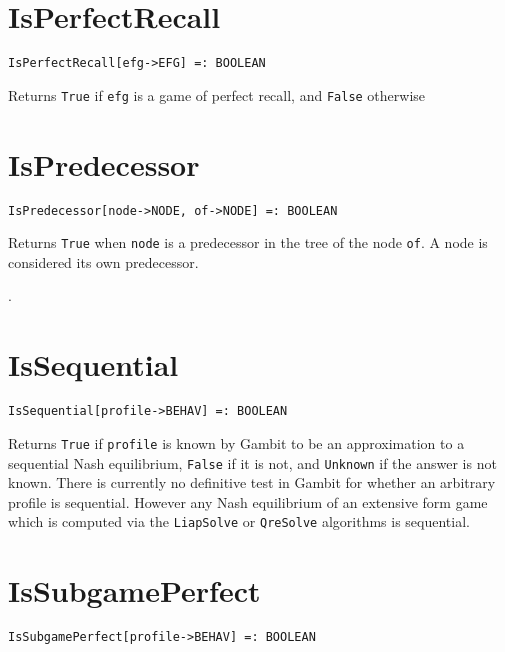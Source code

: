 
\section*{IsPerfectRecall}\label{PrimIsPerfectRecall}
\begin{verbatim}
IsPerfectRecall[efg->EFG] =: BOOLEAN 
\end{verbatim}

\noindent
Returns \verb+True+ if \verb+efg+ is a game of perfect recall, and
\verb+False+ otherwise 


\section*{IsPredecessor}\label{PrimIsPredecessor}
\begin{verbatim}
IsPredecessor[node->NODE, of->NODE] =: BOOLEAN 
\end{verbatim}

\noindent
Returns \verb+True+ when \verb+node+ is a predecessor
in the tree of the node \verb+of+.  A node is considered its own predecessor.

\seealso {}.


\section*{IsSequential}\label{PrimIsSequential}
\begin{verbatim}
IsSequential[profile->BEHAV] =: BOOLEAN 
\end{verbatim}

\noindent
Returns \verb+True+ if \verb+profile+ is known by Gambit to be an
approximation to a sequential Nash equilibrium, \verb+False+ if it is
not, and \verb+Unknown+ if the answer is not known.  There is
currently no definitive test in Gambit for whether an arbitrary
profile is sequential.  However any Nash equilibrium of an extensive
form game which is computed via the \verb+LiapSolve+ or
\verb+QreSolve+ algorithms is sequential. 


\section*{IsSubgamePerfect}\label{PrimIsSubgamePerfect}
\begin{verbatim}
IsSubgamePerfect[profile->BEHAV] =: BOOLEAN 
\end{verbatim}

